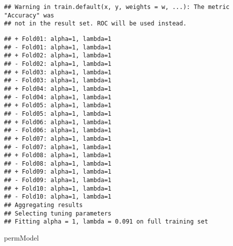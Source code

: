 \documentclass[]{article}
\newenvironment{Shaded}{\begin{snugshade}}{\end{snugshade}}
\newcommand{\NormalTok}[1]{#1}
\begin{document}
\begin{verbatim}
## Warning in train.default(x, y, weights = w, ...): The metric "Accuracy" was
## not in the result set. ROC will be used instead.
\end{verbatim}

\begin{verbatim}
## + Fold01: alpha=1, lambda=1 
## - Fold01: alpha=1, lambda=1 
## + Fold02: alpha=1, lambda=1 
## - Fold02: alpha=1, lambda=1 
## + Fold03: alpha=1, lambda=1 
## - Fold03: alpha=1, lambda=1 
## + Fold04: alpha=1, lambda=1 
## - Fold04: alpha=1, lambda=1 
## + Fold05: alpha=1, lambda=1 
## - Fold05: alpha=1, lambda=1 
## + Fold06: alpha=1, lambda=1 
## - Fold06: alpha=1, lambda=1 
## + Fold07: alpha=1, lambda=1 
## - Fold07: alpha=1, lambda=1 
## + Fold08: alpha=1, lambda=1 
## - Fold08: alpha=1, lambda=1 
## + Fold09: alpha=1, lambda=1 
## - Fold09: alpha=1, lambda=1 
## + Fold10: alpha=1, lambda=1 
## - Fold10: alpha=1, lambda=1 
## Aggregating results
## Selecting tuning parameters
## Fitting alpha = 1, lambda = 0.091 on full training set
\end{verbatim}

\begin{Shaded}
\begin{Highlighting}[]
\NormalTok{permModel}
\end{Highlighting}
\end{Shaded}
\end{document}
